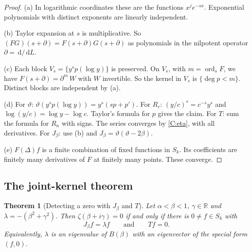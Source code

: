 \documentclass[12pt,letterpaper]{article}
\newtheorem{theorem}{Theorem}[section]
\theoremstyle{definition}
\theoremstyle{remark}
\numberwithin{equation}{section}
\newcommand{\dd}{\,\mathrm{d}}
\newcommand{\RR}{\mathbb{R}}
\newcommand{\ord}{\operatorname{ord}}
\newcommand{\yD}{\vartheta}
\begin{document}
\begin{proof}
(a) In logarithmic coordinates these are the functions $x^je^{-sx}$.
Exponential polynomials with distinct exponents are linearly independent.

(b) Taylor expansion at $s$ is multiplicative. So
$(FG)(s+\partial)=F(s+\partial)G(s+\partial)$ as polynomials in the
nilpotent operator $\partial=\dd/\dd L$.

(c) Each block $V_s=\{y^sp(\log y)\}$ is preserved. On $V_s$, with
$m=\ord_sF$, we have $F(s+\partial)=\partial^m\,W$ with $W$ invertible.
So the kernel in $V_s$ is $\{\deg p<m\}$. Distinct blocks are independent
by (a).

(d) For $\yD$: $\yD(y^sp(\log y))=y^s(sp+p')$. For $R_c$:
$(y/c)^s=c^{-s}y^s$ and $\log(y/c)=\log y-\log c$. Taylor's formula for
$p$ gives the claim. For $T$: sum the formula for $R_n$ with signs. The
series converges by \ref{C:eta}, with all derivatives. For $J_\beta$: use
(b) and $J_\beta=\yD(\yD-2\beta)$.

(e) $F(\Delta)f$ is a finite combination of fixed functions in $S_k$. Its
coefficients are finitely many derivatives of $F$ at finitely many
points. These converge.
\end{proof}

\subsection{The joint-kernel theorem}

\begin{theorem}[Detecting a zero with $J_\beta$ and $T$]\label{thm:spectral}
Let $\alpha<\beta<1$, $\gamma\in\RR$ and $\lambda=-(\beta^2+\gamma^2)$.
Then $\zeta(\beta+i\gamma)=0$ if and only if there is $0\ne f\in S_k$ with
\[
J_\beta f=\lambda f\qquad\text{and}\qquad Tf=0.
\]
Equivalently, $\lambda$ is an eigenvalue of $B(\beta)$ with an
eigenvector of the special form $(f,0)$.
\end{theorem}
\end{document}
